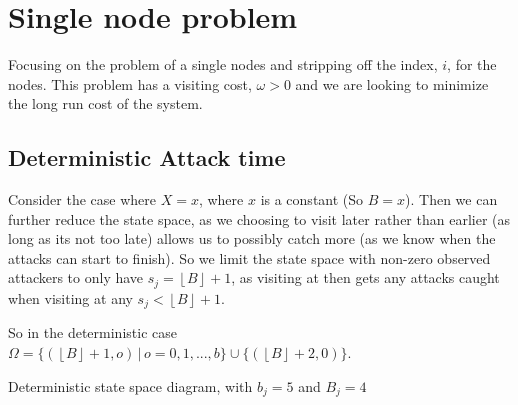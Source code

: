 \documentclass[a4paper,10pt]{article}
\newcommand{\floor}[1]{\left \lfloor #1 \right \rfloor}
\theoremstyle{definition}
\theoremstyle{definition}
\theoremstyle{remark}
\theoremstyle{definition}
\begin{document}
\section{Single node problem}
Focusing on the problem of a single nodes and stripping off the index, $i$, for the nodes. This problem has a visiting cost, $\omega>0$ and we are looking to minimize the long run cost of the system.

\subsection{Deterministic Attack time}
Consider the case where $X=x$, where $x$ is a constant (So $B=x$). Then we can further reduce the state space, as we choosing to visit later rather than earlier (as long as its not too late) allows us to possibly catch more (as we know when the attacks can start to finish). So we limit the state space with non-zero observed attackers to only have $s_{j}=\floor{B}+1$, as visiting at then gets any attacks caught when visiting at any $s_{j} < \floor{B}+1$.

So in the deterministic case $\Omega= \{(\floor{B}+1,o) \, | \, o=0,1,...,b \} \cup \{(\floor{B}+2,0) \}$.

\begin{myfigure}
\begin{center}
\end{center}
\caption{Deterministic state space diagram, with $b_{j}=5$ and $B_{j}=4$}
\end{myfigure}
\end{document}
